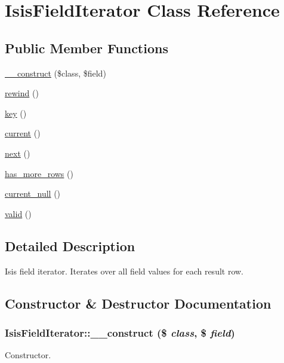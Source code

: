 \hypertarget{classIsisFieldIterator}{
\section{IsisFieldIterator Class Reference}
\label{classIsisFieldIterator}
}
\subsection*{Public Member Functions}
\begin{DoxyCompactItemize}
\item 
\hyperlink{classIsisFieldIterator_a6be7899f5131064d980017dbaa892a1f}{\_\-\_\-construct} (\$class, \$field)
\item 
\hyperlink{classIsisFieldIterator_a19e38c95726a11124f0a46228095cea0}{rewind} ()
\item 
\hyperlink{classIsisFieldIterator_afad4839168701adff27f1037b2d8fafc}{key} ()
\item 
\hyperlink{classIsisFieldIterator_a23a9cbf26e7786777bca2c7a0cb3d87e}{current} ()
\item 
\hyperlink{classIsisFieldIterator_a7a8b7866abd01b6e7ea07c7bb24e9de0}{next} ()
\item 
\hyperlink{classIsisFieldIterator_aff5eab62ba63049c0c09609300dfd348}{has\_\-more\_\-rows} ()
\item 
\hyperlink{classIsisFieldIterator_a0904dcbdd044353ef339c4f1a96d4387}{current\_\-null} ()
\item 
\hyperlink{classIsisFieldIterator_a030cf47b3e4d174e9409c635ce1b49c7}{valid} ()
\end{DoxyCompactItemize}


\subsection{Detailed Description}
Isis field iterator. Iterates over all field values for each result row. 

\subsection{Constructor \& Destructor Documentation}
\hypertarget{classIsisFieldIterator_a6be7899f5131064d980017dbaa892a1f}{
\subsubsection[{\_\-\_\-construct}]{\setlength{\rightskip}{0pt plus 5cm}IsisFieldIterator::\_\-\_\-construct (\$ {\em class}, \/  \$ {\em field})}}
\label{classIsisFieldIterator_a6be7899f5131064d980017dbaa892a1f}
Constructor.


